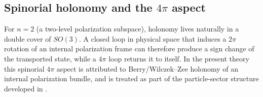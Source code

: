 \subsection{Spinorial holonomy and the $4\pi$ aspect}

For $n=2$ (a two-level polarization subspace), holonomy lives naturally in a double cover of $SO(3)$.
A closed loop in physical space that induces a $2\pi$ rotation of an internal polarization frame can therefore
produce a sign change of the transported state, while a $4\pi$ loop returns it to itself.
In the present theory this spinorial $4\pi$ aspect is attributed to Berry/Wilczek--Zee holonomy of an internal
polarization bundle, and is treated as part of the particle-sector structure developed in .

